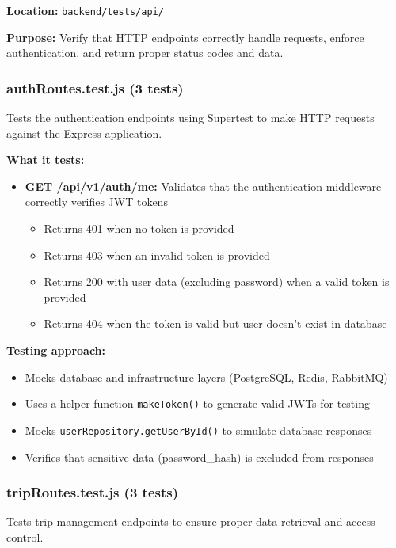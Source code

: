 \textbf{Location:} \texttt{backend/tests/api/}

\textbf{Purpose:} Verify that HTTP endpoints correctly handle requests, enforce authentication, and return proper status codes and data.

\subsubsection{authRoutes.test.js (3 tests)}
\label{subsubsec:auth_routes_test}

Tests the authentication endpoints using Supertest to make HTTP requests against the Express application.

\textbf{What it tests:}
\begin{itemize}
    \item \textbf{GET /api/v1/auth/me:} Validates that the authentication middleware correctly verifies JWT tokens
    \begin{itemize}
        \item Returns 401 when no token is provided
        \item Returns 403 when an invalid token is provided  
        \item Returns 200 with user data (excluding password) when a valid token is provided
        \item Returns 404 when the token is valid but user doesn't exist in database
    \end{itemize}
\end{itemize}

\textbf{Testing approach:}
\begin{itemize}
    \item Mocks database and infrastructure layers (PostgreSQL, Redis, RabbitMQ)
    \item Uses a helper function \texttt{makeToken()} to generate valid JWTs for testing
    \item Mocks \texttt{userRepository.getUserById()} to simulate database responses
    \item Verifies that sensitive data (password\_hash) is excluded from responses
\end{itemize}

\subsubsection{tripRoutes.test.js (3 tests)}
\label{subsubsec:trip_routes_test}

Tests trip management endpoints to ensure proper data retrieval and access control.

